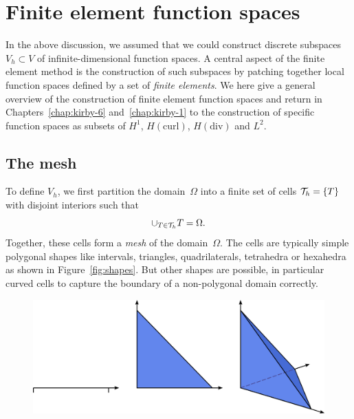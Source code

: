 \section{Finite element function spaces}

In the above discussion, we assumed that we could construct discrete
subspaces $V_h \subset V$ of infinite-dimensional function spaces. A
central aspect of the finite element method is the construction of
such subspaces by patching together local function spaces defined by a
set of \emph{finite elements}. We here give a general overview of the
construction of finite element function spaces and return in
Chapters~\ref{chap:kirby-6} and~\ref{chap:kirby-1} to the construction
of specific function spaces as subsets of $H^1$, $H(\mathrm{curl})$,
$H(\mathrm{div})$ and $L^2$.

\subsection{The mesh}

To define $V_h$, we first partition the domain~$\Omega$ into a finite
set of cells $\mathcal{T}_h = \{T\}$ with disjoint interiors such that\vspace*{4pt}
\begin{equation}
  \cup_{T\in\mesh} T = \Omega.\vspace*{4pt}
\end{equation}
Together, these cells form a \emph{mesh} of the domain~$\Omega$. The
cells are typically simple polygonal shapes like intervals, triangles,
quadrilaterals, tetrahedra or hexahedra as shown in
Figure~\ref{fig:shapes}. But other shapes are possible, in particular
curved cells to capture the boundary of a non-polygonal domain
correctly.

\begin{figure}
\bwfig
  {\includegraphics[width=\largefig]{chapters/kirby-7/pdf/cells.pdf}}
\end{figure}

